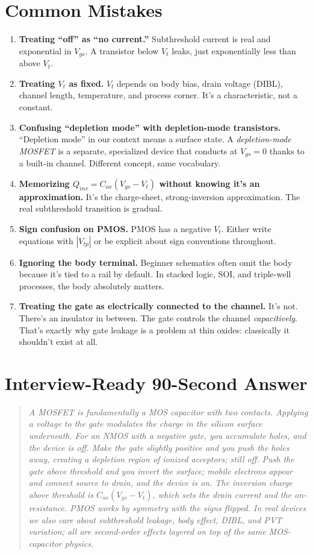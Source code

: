 \documentclass[11pt]{article}
\begin{document}
\section{Common Mistakes}

\begin{enumerate}
\item \textbf{Treating ``off'' as ``no current.''} Subthreshold current is real and exponential in $V_{gs}$. A transistor below $V_t$ leaks, just exponentially less than above $V_t$.
\item \textbf{Treating $V_t$ as fixed.} $V_t$ depends on body bias, drain voltage (DIBL), channel length, temperature, and process corner. It's a characteristic, not a constant.
\item \textbf{Confusing ``depletion mode'' with depletion-mode transistors.} ``Depletion mode'' in our context means a surface state. A \emph{depletion-mode MOSFET} is a separate, specialized device that conducts at $V_{gs} = 0$ thanks to a built-in channel. Different concept, same vocabulary.
\item \textbf{Memorizing $Q_{inv} = C_{ox}(V_{gs}-V_t)$ without knowing it's an approximation.} It's the charge-sheet, strong-inversion approximation. The real subthreshold transition is gradual.
\item \textbf{Sign confusion on PMOS.} PMOS has a negative $V_t$. Either write equations with $|V_{tp}|$ or be explicit about sign conventions throughout.
\item \textbf{Ignoring the body terminal.} Beginner schematics often omit the body because it's tied to a rail by default. In stacked logic, SOI, and triple-well processes, the body absolutely matters.
\item \textbf{Treating the gate as electrically connected to the channel.} It's not. There's an insulator in between. The gate controls the channel \emph{capacitively}. That's exactly why gate leakage is a problem at thin oxides: classically it shouldn't exist at all.
\end{enumerate}

\section{Interview-Ready 90-Second Answer}

\begin{quote}\itshape
A MOSFET is fundamentally a MOS capacitor with two contacts. Applying a voltage to the gate modulates the charge in the silicon surface underneath. For an NMOS with a negative gate, you accumulate holes, and the device is off. Make the gate slightly positive and you push the holes away, creating a depletion region of ionized acceptors; still off. Push the gate above threshold and you invert the surface; mobile electrons appear and connect source to drain, and the device is on. The inversion charge above threshold is $C_{ox}(V_{gs}-V_t)$, which sets the drain current and the on-resistance. PMOS works by symmetry with the signs flipped. In real devices we also care about subthreshold leakage, body effect, DIBL, and PVT variation; all are second-order effects layered on top of the same MOS-capacitor physics.
\end{quote}
\end{document}
